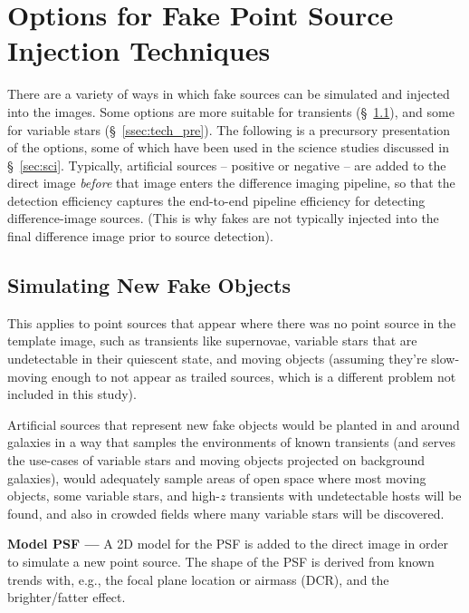 \documentclass[DM,lsstdraft,toc]{lsstdoc}
\begin{document}
\section{Options for Fake Point Source Injection Techniques}\label{sec:tech}

There are a variety of ways in which fake sources can be simulated and injected into the images. Some options are more suitable for transients (\S~\ref{ssec:tech_new}), and some for variable stars (\S~\ref{ssec:tech_pre}). The following is a precursory presentation of the options, some of which have been used in the science studies discussed in \S~\ref{sec:sci}. Typically, artificial sources -- positive or negative -- are added to the direct image {\it before} that image enters the difference imaging pipeline, so that the detection efficiency captures the end-to-end pipeline efficiency for detecting difference-image sources. (This is why fakes are not typically injected into the final difference image prior to source detection).

\subsection{Simulating New Fake Objects}\label{ssec:tech_new}

This applies to point sources that appear where there was no point source in the template image, such as transients like supernovae, variable stars that are undetectable in their quiescent state, and moving objects (assuming they're slow-moving enough to not appear as trailed sources, which is a different problem not included in this study). 

Artificial sources that represent new fake objects would be planted in and around galaxies in a way that samples the environments of known transients (and serves the use-cases of variable stars and moving objects projected on background galaxies), would adequately sample areas of open space where most moving objects, some variable stars, and high-$z$ transients with undetectable hosts will be found, and also in crowded fields where many variable stars will be discovered.

{\bf Model PSF ---} A 2D model for the PSF is added to the direct image in order to simulate a new point source. The shape of the PSF is derived from known trends with, e.g., the focal plane location or airmass (DCR), and the brighter/fatter effect.
\end{document}
